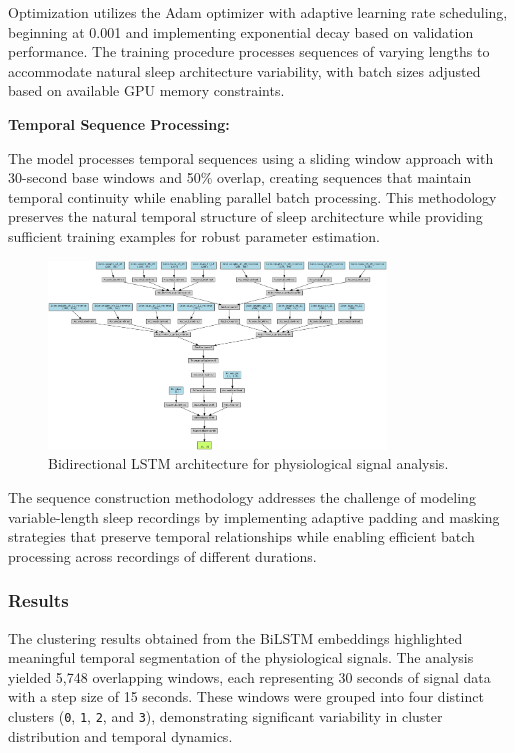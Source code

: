 \documentclass[a4paper,12pt,twoside]{article}
\begin{document}
Optimization utilizes the Adam optimizer with adaptive learning rate scheduling, beginning at 0.001 and implementing exponential decay based on validation performance. The training procedure processes sequences of varying lengths to accommodate natural sleep architecture variability, with batch sizes adjusted based on available GPU memory constraints.

\textbf{Temporal Sequence Processing:}

The model processes temporal sequences using a sliding window approach with 30-second base windows and 50\% overlap, creating sequences that maintain temporal continuity while enabling parallel batch processing. This methodology preserves the natural temporal structure of sleep architecture while providing sufficient training examples for robust parameter estimation.

\begin{figure}
\centering
\includegraphics[width=0.8\textwidth]{img/bilstm_model.png}
\caption{Bidirectional LSTM architecture for physiological signal analysis.}
\end{figure}

The sequence construction methodology addresses the challenge of modeling variable-length sleep recordings by implementing adaptive padding and masking strategies that preserve temporal relationships while enabling efficient batch processing across recordings of different durations.
\subsubsection{Results}

The clustering results obtained from the BiLSTM embeddings highlighted meaningful temporal segmentation of the physiological signals. The analysis yielded 5,748 overlapping windows, each representing 30 seconds of signal data with a step size of 15 seconds. These windows were grouped into four distinct clusters (\texttt{0}, \texttt{1}, \texttt{2}, and \texttt{3}), demonstrating significant variability in cluster distribution and temporal dynamics.
\end{document}
